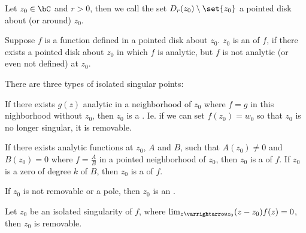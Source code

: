 \documentclass[10pt]{article}
\let\to=\varrightarrow
\begin{document}


\bigskip

\begin{defn*}

    Let $z_0\in\bC$ and $r>0$, then we call the set $D_r(z_0)\setminus\set{z_0}$ a pointed disk about (or around) $z_0$.

\end{defn*}

\begin{defn*}

    Suppose $f$ is a function defined in a pointed disk about $z_0$.
    $z_0$ is an  of $f$, if there exists a pointed disk about $z_0$ in which $f$ is analytic, but $f$ is not analytic (or even not defined) at $z_0$.

    There are three types of isolated singular points:
    \benum
        \item If there exists $g(z)$ analytic in a neighborhood of $z_0$ where $f=g$ in this nighborhood without $z_0$, then $z_0$ is a .
        Ie. if we can set $f(z_0)=w_0$ so that $z_0$ is no longer singular, it is removable.
        \item If there exists analytic functions at $z_0$, $A$ and $B$, such that $A(z_0)\neq0$ and $B(z_0)=0$ where $f=\frac AB$ in a pointed neighborhood of $z_0$, then $z_0$ is a  of $f$.
        If $z_0$ is a zero of degree $k$ of $B$, then $z_0$ is a  of $f$.
        \item If $z_0$ is not removable or a pole, then $z_0$ is an .
    \eenum

\end{defn*}

\begin{thrm*}

    Let $z_0$ be an isolated singularity of $f$, where $\lim_{z\to z_0}(z-z_0)f(z)=0$, then $z_0$ is removable.

\end{thrm*}
\end{document}
